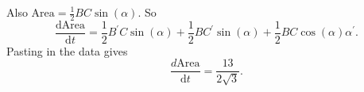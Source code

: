 \documentclass[12pt,fleqn,answers]{exam}
\begin{document}
\begin{questions}
\begin{solution}
   
   Also $\mathrm{Area} = \frac{1}{2} B C \sin(\alpha)$.  So
   \[
     \frac{\mathrm{d} \mathrm{Area}}{\mathrm{d} t} = \frac{1}{2} B^\prime  C \sin(\alpha) + 
     \frac{1}{2} B C^\prime \sin(\alpha) + \frac{1}{2} B  C \cos(\alpha) \alpha^\prime.     
   \]
   Pasting in the data gives
  \[
     \frac{d \mathrm{Area}}{\mathrm{d} t} = \frac{13}{2 \sqrt{3}}.  
   \]
          \end{solution}
\end{questions}
\end{document}
